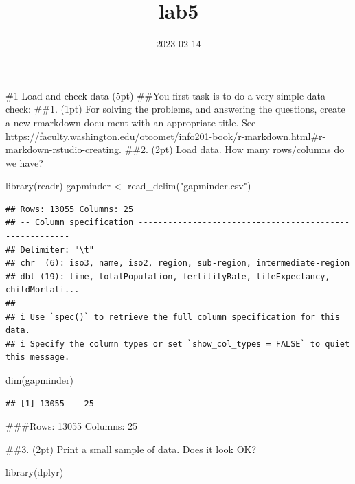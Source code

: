 \documentclass[
]{article}
\title{lab5}
\author{}
\date{\vspace{-2.5em}2023-02-14}
\newenvironment{Shaded}{\begin{snugshade}}{\end{snugshade}}
\newcommand{\FunctionTok}[1]{\textcolor[rgb]{0.00,0.00,0.00}{#1}}
\newcommand{\NormalTok}[1]{#1}
\newcommand{\OtherTok}[1]{\textcolor[rgb]{0.56,0.35,0.01}{#1}}
\newcommand{\StringTok}[1]{\textcolor[rgb]{0.31,0.60,0.02}{#1}}
\begin{document}
\maketitle

\#1 Load and check data (5pt) \#\#You first task is to do a very simple
data check: \#\#1. (1pt) For solving the problems, and answering the
questions, create a new rmarkdown docu-ment with an appropriate title.
See
\url{https://faculty.washington.edu/otoomet/info201-book/r-markdown.html\#r-markdown-rstudio-creating}.
\#\#2. (2pt) Load data. How many rows/columns do we have?

\begin{Shaded}
\begin{Highlighting}[]
\FunctionTok{library}\NormalTok{(readr)}
\NormalTok{gapminder }\OtherTok{\textless{}{-}} \FunctionTok{read\_delim}\NormalTok{(}\StringTok{"gapminder.csv"}\NormalTok{)}
\end{Highlighting}
\end{Shaded}

\begin{verbatim}
## Rows: 13055 Columns: 25
## -- Column specification --------------------------------------------------------
## Delimiter: "\t"
## chr  (6): iso3, name, iso2, region, sub-region, intermediate-region
## dbl (19): time, totalPopulation, fertilityRate, lifeExpectancy, childMortali...
## 
## i Use `spec()` to retrieve the full column specification for this data.
## i Specify the column types or set `show_col_types = FALSE` to quiet this message.
\end{verbatim}

\begin{Shaded}
\begin{Highlighting}[]
\FunctionTok{dim}\NormalTok{(gapminder)}
\end{Highlighting}
\end{Shaded}

\begin{verbatim}
## [1] 13055    25
\end{verbatim}

\#\#\#Rows: 13055 Columns: 25

\#\#3. (2pt) Print a small sample of data. Does it look OK?

\begin{Shaded}
\begin{Highlighting}[]
\FunctionTok{library}\NormalTok{(dplyr)}
\end{Highlighting}
\end{Shaded}
\end{document}
